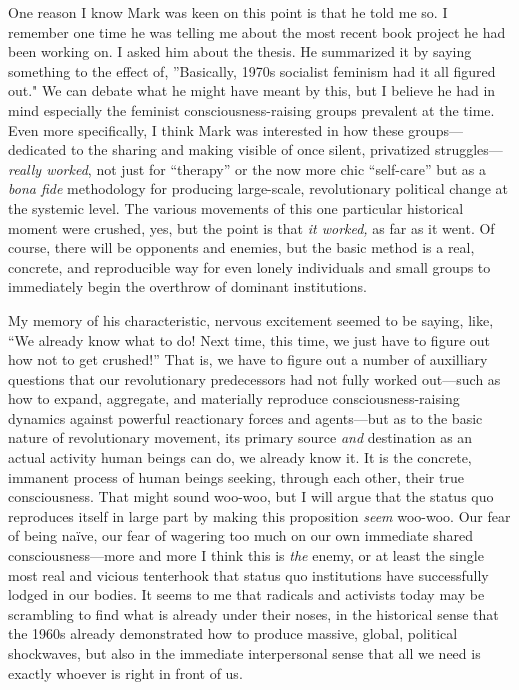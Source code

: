 \documentclass[a4paper,12pt,margin=.5in]{article}
\begin{document}
One reason I know Mark was keen on this point is that he told me so. I
remember one time he was telling me about the most recent book project
he had been working on. I asked him about the thesis. He summarized it
by saying something to the effect of, ''Basically, 1970s socialist
feminism had it all figured out." We can debate what he might have meant
by this, but I believe he had in mind especially the feminist
consciousness-raising groups prevalent at the time. Even more
specifically, I think Mark was interested in how these
groups---dedicated to the sharing and making visible of once silent,
privatized struggles---\emph{really worked}, not just for ``therapy'' or
the now more chic ``self-care'' but as a \emph{bona fide} methodology
for producing large-scale, revolutionary political change at the
systemic level. The various movements of this one particular historical
moment were crushed, yes, but the point is that \emph{it worked,} as far
as it went. Of course, there will be opponents and enemies, but the
basic method is a real, concrete, and reproducible way for even lonely
individuals and small groups to immediately begin the overthrow of
dominant institutions.

My memory of his characteristic, nervous excitement seemed to be saying,
like, ``We already know what to do! Next time, this time, we just have
to figure out how not to get crushed!'' That is, we have to figure out a
number of auxilliary questions that our revolutionary predecessors had
not fully worked out---such as how to expand, aggregate, and materially
reproduce consciousness-raising dynamics against powerful reactionary
forces and agents---but as to the basic nature of revolutionary
movement, its primary source \emph{and} destination as an actual
activity human beings can do, we already know it. It is the concrete,
immanent process of human beings seeking, through each other, their true
consciousness. That might sound woo-woo, but I will argue that the
status quo reproduces itself in large part by making this proposition
\emph{seem} woo-woo. Our fear of being naïve, our fear of wagering too
much on our own immediate shared consciousness---more and more I think
this is \emph{the} enemy, or at least the single most real and vicious
tenterhook that status quo institutions have successfully lodged in our
bodies. It seems to me that radicals and activists today may be
scrambling to find what is already under their noses, in the historical
sense that the 1960s already demonstrated how to produce massive,
global, political shockwaves, but also in the immediate interpersonal
sense that all we need is exactly whoever is right in front of us.
\end{document}
